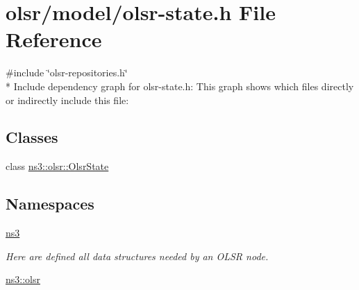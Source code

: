 \hypertarget{olsr-state_8h}{}\section{olsr/model/olsr-\/state.h File Reference}
\label{olsr-state_8h}
{\ttfamily \#include \char`\"{}olsr-\/repositories.\+h\char`\"{}}\\*
Include dependency graph for olsr-\/state.h\+:
This graph shows which files directly or indirectly include this file\+:
\subsection*{Classes}
\begin{DoxyCompactItemize}
\item 
class \hyperlink{classns3_1_1olsr_1_1OlsrState}{ns3\+::olsr\+::\+Olsr\+State}
\end{DoxyCompactItemize}
\subsection*{Namespaces}
\begin{DoxyCompactItemize}
\item 
 \hyperlink{namespacens3}{ns3}
\begin{DoxyCompactList}\small\item\em Here are defined all data structures needed by an O\+L\+SR node. \end{DoxyCompactList}\item 
 \hyperlink{namespacens3_1_1olsr}{ns3\+::olsr}
\end{DoxyCompactItemize}
